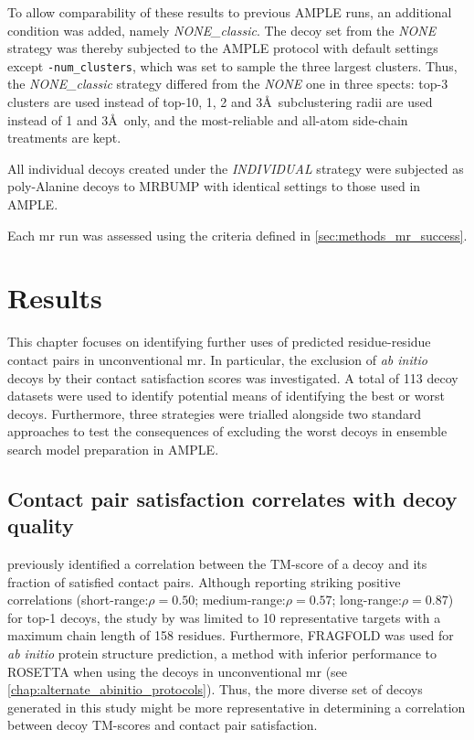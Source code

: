 To allow comparability of these results to previous AMPLE runs, an additional condition was added, namely \textit{NONE\_classic}. The decoy set from the \textit{NONE} strategy was thereby subjected to the AMPLE protocol with default settings except \texttt{-num\_clusters}, which was set to sample the three largest clusters. Thus, the \textit{NONE\_classic} strategy differed from the \textit{NONE} one in three spects: top-3 clusters are used instead of top-10, 1, 2 and 3\AA\ subclustering radii are used instead of 1 and 3\AA\ only, and the most-reliable and all-atom side-chain treatments are kept.

All individual decoys created under the \textit{INDIVIDUAL} strategy were subjected as poly-Alanine decoys to MRBUMP \cite{Keegan2018-kn} with identical settings to those used in AMPLE. 

Each \gls{mr} run was assessed using the criteria defined in \cref{sec:methods_mr_success}.

\section{Results}
This chapter focuses on identifying further uses of predicted residue-residue contact pairs in unconventional \gls{mr}. In particular, the exclusion of \textit{ab initio} decoys by their contact satisfaction scores was investigated. A total of 113 decoy datasets were used to identify potential means of identifying the best or worst decoys. Furthermore, three strategies were trialled alongside two standard approaches to test the consequences of excluding the worst decoys in ensemble search model preparation in AMPLE.

\subsection{Contact pair satisfaction correlates with decoy quality}
\textcite{Kosciolek2014-bt} previously identified a correlation between the TM-score of a decoy and its fraction of satisfied contact pairs. Although reporting striking positive correlations (short-range:$\rho=0.50$; medium-range:$\rho=0.57$; long-range:$\rho=0.87$) for top-1 decoys, the study by \textcite{Kosciolek2014-bt} was limited to 10 representative targets with a maximum chain length of 158 residues. Furthermore, FRAGFOLD \cite{Jones2001-mc} was used for \textit{ab initio} protein structure prediction, a method with inferior performance to ROSETTA \cite{Rohl2004-dj} when using the decoys in unconventional \gls{mr} (see \cref{chap:alternate_abinitio_protocols}). Thus, the more diverse set of decoys generated in this study might be more representative in determining a correlation between decoy TM-scores and contact pair satisfaction.

